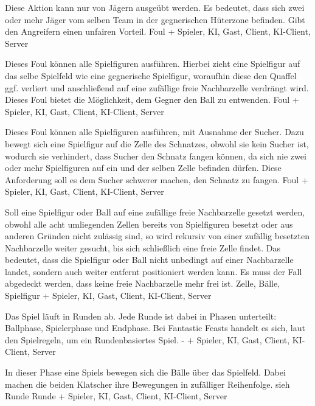         {Diese Aktion kann nur von Jägern ausgeübt werden. Es bedeutet, dass sich zwei oder mehr Jäger vom selben Team in der gegnerischen Hüterzone befinden.}
        {Gibt den Angreifern einen unfairen Vorteil.}
        {Foul}
        {+}
        {Spieler, KI, Gast, Client, KI-Client, Server}

        {Dieses Foul können alle Spielfiguren ausführen. Hierbei zieht eine Spielfigur auf das selbe Spielfeld wie eine gegnerische Spielfigur, woraufhin diese den Quaffel ggf. verliert und anschließend auf eine zufällige freie Nachbarzelle verdrängt wird.}
        {Dieses Foul bietet die Möglichkeit, dem Gegner den Ball zu entwenden.}
        {Foul}
        {+}
        {Spieler, KI, Gast, Client, KI-Client, Server}

        {Dieses Foul können alle Spielfiguren ausführen, mit Ausnahme der Sucher. Dazu bewegt sich eine Spielfigur auf die Zelle des Schnatzes, obwohl sie kein Sucher ist, wodurch sie verhindert, dass Sucher den Schnatz fangen können, da sich nie zwei oder mehr Spielfiguren auf ein und der selben Zelle befinden dürfen.}
        {Diese Anforderung soll es dem Sucher schwerer machen, den Schnatz zu fangen.}
        {Foul}
        {+}
        {Spieler, KI, Gast, Client, KI-Client, Server}
        
        {Soll eine Spielfigur oder Ball auf eine zufällige freie Nachbarzelle gesetzt werden, obwohl alle acht umliegenden Zellen bereits von Spielfiguren besetzt oder aus anderen Gründen nicht zulässig sind, so wird rekursiv von einer zufällig besetzten Nachbarzelle weiter gesucht, bis sich schließlich eine freie Zelle findet. Das bedeutet, dass die Spielfigur oder Ball nicht unbedingt auf einer Nachbarzelle landet, sondern auch weiter entfernt positioniert werden kann.}
        {Es muss der Fall abgedeckt werden, dass keine freie Nachbarzelle mehr frei ist.}
        {Zelle, Bälle, Spielfigur}
        {+}
        {Spieler, KI, Gast, Client, KI-Client, Server}


        {Das Spiel läuft in Runden ab. Jede Runde ist dabei in Phasen unterteilt: Ballphase, Spielerphase und Endphase.}
        {Bei \glqq{}Fantastic Feasts\grqq{} handelt es sich, laut den Spielregeln, um ein Rundenbasiertes Spiel.}
        {-}
        {+}
        {Spieler, KI, Gast, Client, KI-Client, Server}

        {In dieser Phase eine Spiels bewegen sich die Bälle über das Spielfeld. Dabei machen die beiden Klatscher ihre Bewegungen in zufälliger Reihenfolge.}
        {sieh Runde}
        {Runde}
        {+}
        {Spieler, KI, Gast, Client, KI-Client, Server}
        

